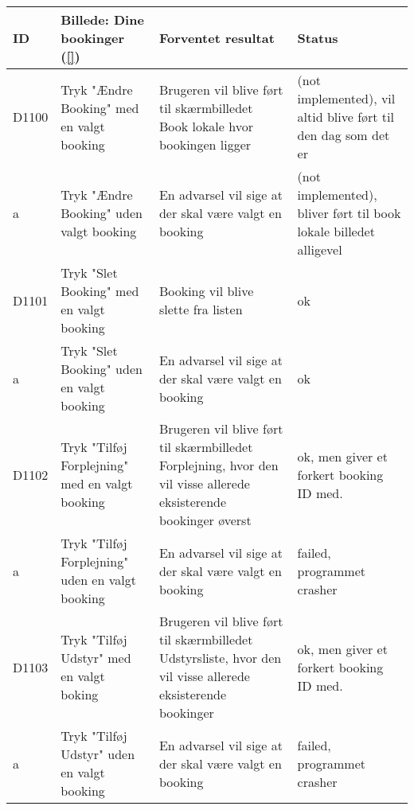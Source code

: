 \begin{tabular}{ |p{1cm}| p{5cm} | p{4cm} | p{1cm} | }
\hline
ID & Billede: Dine bookinger (\ref{})  & Forventet resultat & Status\\ 
\hline
D1100 & Tryk "Ændre Booking" med en valgt booking & Brugeren vil blive ført til skærmbilledet Book lokale hvor bookingen ligger &(not implemented), vil altid blive ført til den dag som det er \\
\hline
a & Tryk "Ændre Booking" uden valgt booking & En advarsel vil sige at der skal være valgt en booking &(not implemented), bliver ført til book lokale billedet alligevel \\
\hline
D1101 & Tryk "Slet Booking" med en valgt booking & Booking vil blive slette fra listen & ok \\
\hline
a & Tryk "Slet Booking" uden en valgt booking & En advarsel vil sige at der skal være valgt en booking & ok \\
\hline
D1102 & Tryk "Tilføj Forplejning" med en valgt booking & Brugeren vil blive ført til skærmbilledet Forplejning, hvor den vil visse allerede eksisterende bookinger øverst & ok, men giver et forkert booking ID med. \\
\hline
a &  Tryk "Tilføj Forplejning" uden en valgt booking & En advarsel vil sige at der skal være valgt en booking &failed, programmet crasher \\
\hline
D1103 & Tryk "Tilføj Udstyr" med en valgt boking & Brugeren vil blive ført til skærmbilledet Udstyrsliste, hvor den vil visse allerede eksisterende bookinger & ok, men giver et forkert booking ID med. \\
\hline
a & Tryk "Tilføj Udstyr" uden en valgt booking & En advarsel vil sige at der skal være valgt en booking & failed, programmet crasher \\
\hline
\end{tabular}